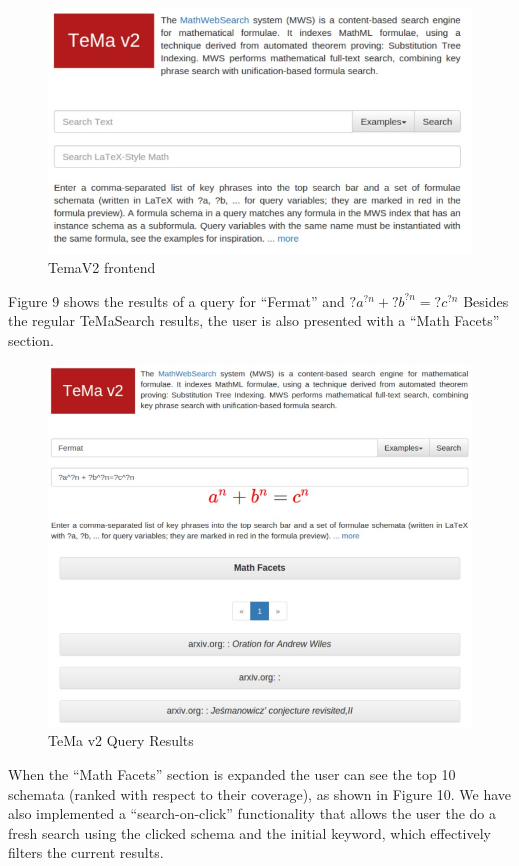 \documentclass{deliverablereport}
\begin{document}
\begin{figure}[H]
\centering
 \includegraphics[scale=0.8]{figure8.jpg}
 \caption{TemaV2 frontend}
\end{figure}

Figure 9 shows the results of a query for “Fermat” and $?a^{?n}+?b^{?n}=?c^{?n}$ Besides the regular TeMaSearch results, the user is also presented with a “Math Facets” section.

\begin{figure}[H]
\centering
 \includegraphics[scale=0.6]{figure9.jpg}
 \caption{TeMa v2 Query Results}
\end{figure}

When the “Math Facets” section is expanded the user can see the top 10 schemata (ranked with respect to their coverage), as shown in Figure 10. We have also implemented a “search-on-click” functionality that allows the user the do a fresh search using the clicked schema and the initial keyword, which effectively filters the current results.
\end{document}
